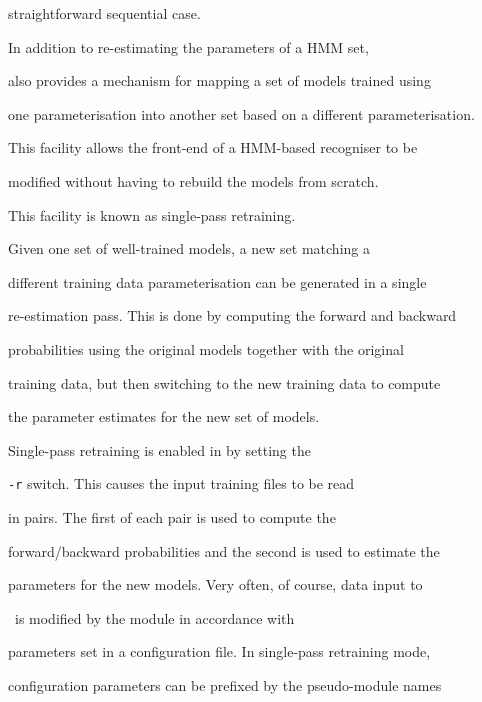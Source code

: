 straightforward sequential case. 










In addition to re-estimating the parameters of a HMM set, 


also provides a mechanism for mapping a set of models trained using


one parameterisation into another set based on a different parameterisation.


This facility allows the front-end of a HMM-based recogniser to be 


modified without having to rebuild the models from scratch.





This facility is known as single-pass retraining.


Given one set of well-trained models, a new set matching a


different training data parameterisation can be generated in a single


re-estimation pass. This is done by computing the forward and backward


probabilities using the original models together with the original


training data, but then switching to the new training data to compute


the parameter estimates for the new set of models.





Single-pass retraining is enabled in  by setting the


\texttt{-r} switch.  This causes the input training files to be read


in pairs.  The first of each pair is used to compute the


forward/backward probabilities and the second is used to estimate the


parameters for the new models.  Very often, of course, data input to


\HTK\ is modified by the  module in accordance with


parameters set in a configuration file.  In single-pass retraining mode,


configuration parameters can be prefixed by the pseudo-module names


